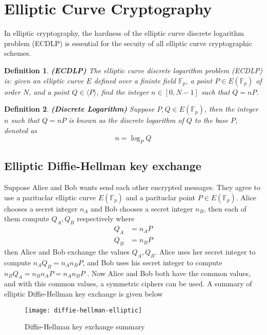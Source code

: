 \documentclass[a4 paper]{article}
\newcommand{\?}{\stackrel{?}{=}}
\newtheorem{definition}{Definition}[section]
\begin{document}
\section{Elliptic Curve Cryptography}
In elliptic cryptography, the hardness of the elliptic curve discrete logarithm problem (ECDLP) is essential for the secuity of all elliptic curve cryptographic schemes. 

\begin{Definition}
\begin{definition}
\textbf{(ECDLP)} The elliptic curve discrete logarithm problem (ECDLP) is: given an elliptic curve $ E $ defined over a fininte field $ \mathbb{F}_p $, a point $ P \in E(\mathbb{F}_p) $ of order $ N $, and a point $ Q \in \langle P \rangle $, find the integer $ n \in [0, N-1] $ such that $ Q = nP $. 
\end{definition}
\end{Definition}

\begin{Definition}
\begin{definition}
\textbf{(Discrete Logarithm)} Suppose $ P, Q \in E(\mathbb{F}_p) $, then the integer $ n $ such that $ Q = nP $ is known as the discrete logarithm of $ Q $ to the base $ P $, denoted as 
$$ n = \log_P Q $$
\end{definition}
\end{Definition}


\subsection{Elliptic Diffie-Hellman key exchange}
Suppose Alice and Bob wants send each other encrypted messages. They agree to use a parituclar elliptic curve $ E(\mathbb{F}_p) $ and a parituclar point $ P \in E(\mathbb{F}_p) $. Alice chooses a secret integer $ n_A  $ and Bob chooses a secret integer $ n_B $, then each of them compute $ Q_A, Q_B $ respectively where 
\begin{align*}
    Q_A & = n_A P \\ 
    Q_B & = n _B P
\end{align*}
then Alice and Bob exchange the values $ Q_A , Q_B $. Alice uses her secret integer to compute $ n_A Q_B = n_A n_B P  $, and Bob uses his secret integer to compute $ n_B Q_A = n_B n_A P = n_A n_B P $ . Now Alice and Bob both have the common values, and with this common values, a symmetric ciphers can be used. A summary of elliptic Diffie-Hellman key exchange is given below 
\begin{figure}[H]
    \centering
    \texttt{[image: diffie-hellman-elliptic]}
    \caption{Diffie-Hellman key exchange summary \cite[p.297]{hoffstein2008introduction}\label{fig:sample}}
\end{figure}
\end{document}
